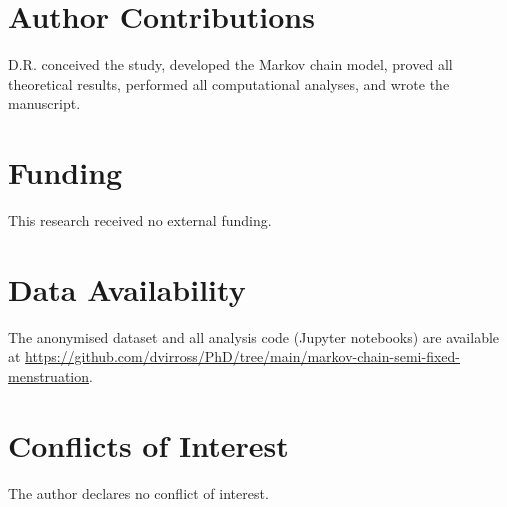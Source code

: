 \documentclass[12pt,a4paper]{article}
\begin{document}
\section*{Author Contributions}
D.R. conceived the study, developed the Markov chain model, proved all theoretical
results, performed all computational analyses, and wrote the manuscript.

\section*{Funding}
This research received no external funding.

\section*{Data Availability}
The anonymised dataset and all analysis code (Jupyter notebooks) are available at
\url{https://github.com/dvirross/PhD/tree/main/markov-chain-semi-fixed-menstruation}.

\section*{Conflicts of Interest}
The author declares no conflict of interest.




\end{document}
